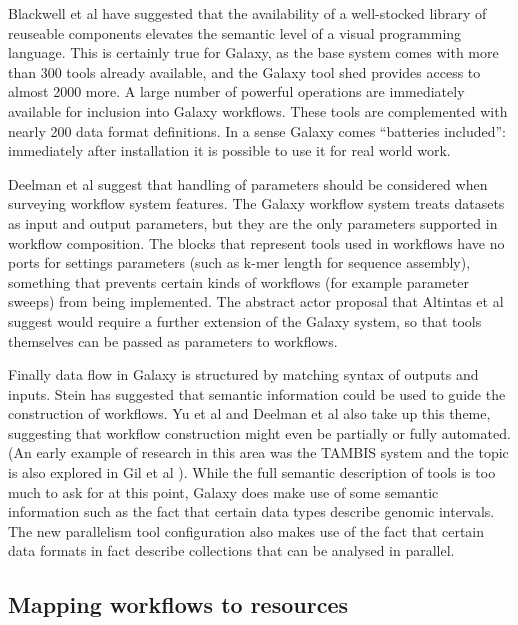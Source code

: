 \documentclass[a4paper,10pt]{scrreprt} \usepackage[utf8]{inputenc}
\begin{document}
Blackwell et al have suggested that the availability of a well-stocked library of reuseable components elevates the semantic level of a visual programming language. This is certainly true for Galaxy, as the base system comes with more than 300 tools already available, and the Galaxy tool shed provides access to almost 2000 more. A large number of powerful operations are immediately available for inclusion into Galaxy workflows. These tools are complemented with nearly 200 data format definitions. In a sense Galaxy comes ``batteries included'': immediately after installation it is possible to use it for real world work.

Deelman et al suggest that handling of parameters should be considered when surveying workflow system features. The Galaxy workflow system treats datasets as input and output parameters, but they are the only parameters supported in workflow composition. The blocks that represent tools used in workflows have no ports for settings parameters (such as k-mer length for sequence assembly), something that prevents certain kinds of workflows (for example parameter sweeps) from being implemented. The abstract actor proposal that Altintas et al suggest would require a further extension of the Galaxy system, so that tools themselves can be passed as parameters to workflows.

Finally data flow in Galaxy is structured by matching syntax of outputs and inputs. Stein \cite{stein_towards_2008} has suggested that semantic information could be used to guide the construction of workflows. Yu et al and Deelman et al also take up this theme, suggesting that workflow construction might even be partially or fully automated. (An early example of research in this area was the TAMBIS system \cite{stevens_tambis:_2000} and the topic is also explored in Gil et al \cite{gil_artificial_2004}). While the full semantic description of tools is too much to ask for at this point, Galaxy does make use of some semantic information such as the fact that certain data types describe genomic intervals. The new parallelism tool configuration also makes use of the fact that certain data formats in fact describe collections that can be analysed in parallel.

\subsection{Mapping workflows to resources}
\end{document}
